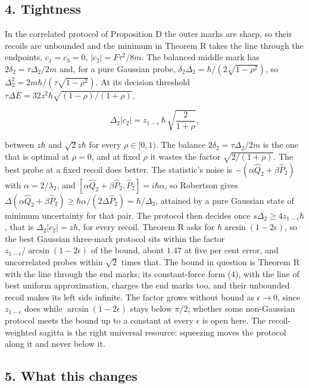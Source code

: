 \documentclass[11pt,a4paper]{article}
\begin{document}
\hypertarget{tightness}{%
\subsection{4. Tightness}\label{tightness}}

In the correlated protocol of Proposition D the outer marks are sharp,
so their recoils are unbounded and the minimum in Theorem R takes the
line through the endpoints, \(c_1=c_3=0\), \(|c_2|=F\tau^2/8m\). The
balanced middle mark has \(2\delta_2=\tau\Delta_2/2m\) and, for a pure
Gaussian probe, \(\delta_2\Delta_2=\hbar/(2\sqrt{1-\rho^2})\), so
\(\Delta_2^2=2m\hbar/(\tau\sqrt{1-\rho^2})\). At its decision threshold
\(\tau\Delta E=32z^2\hbar\sqrt{(1-\rho)/(1+\rho)}\),

\[\Delta_2|c_2|=z_{1-\epsilon}\,\hbar\,\sqrt{\frac{2}{1+\rho}},\]

between \(z\hbar\) and \(\sqrt2z\hbar\) for every \(\rho\in[0,1)\). The
balance \(2\delta_2=\tau\Delta_2/2m\) is the one that is optimal at
\(\rho=0\), and at fixed \(\rho\) it wastes the factor
\(\sqrt{2/(1+\rho)}\). The best probe at a fixed recoil does better. The
statistic's noise is \(-(\alpha\hat Q_2+\beta\hat P_2)\) with
\(\alpha=2/\lambda_2\), and
\([\alpha\hat Q_2+\beta\hat P_2,\hat P_2]=i\hbar\alpha\), so Robertson
gives
\(\Delta(\alpha\hat Q_2+\beta\hat P_2)\ge\hbar\alpha/(2\Delta\hat P_2)=\hbar/\Delta_2\),
attained by a pure Gaussian state of minimum uncertainty for that pair.
The protocol then decides once \(s\Delta_2\ge4z_{1-\epsilon}\hbar\),
that is \(\Delta_2|c_2|=z\hbar\), for every recoil. Theorem R asks for
\(\hbar\arcsin(1-2\epsilon)\), so the best Gaussian three-mark protocol
sits within the factor \(z_{1-\epsilon}/\arcsin(1-2\epsilon)\) of the
bound, about \(1.47\) at five per cent error, and uncorrelated probes
within \(\sqrt2\) times that. The bound in question is Theorem R with
the line through the end marks; its constant-force form (4), with the
line of best uniform approximation, charges the end marks too, and their
unbounded recoil makes its left side infinite. The factor grows without
bound as \(\epsilon\to0\), since \(z_{1-\epsilon}\) does while
\(\arcsin(1-2\epsilon)\) stays below \(\pi/2\); whether some
non-Gaussian protocol meets the bound up to a constant at every
\(\epsilon\) is open here. The recoil-weighted sagitta is the right
universal resource: squeezing moves the protocol along it and never
below it.

\hypertarget{what-this-changes}{%
\subsection{5. What this changes}\label{what-this-changes}}
\end{document}
